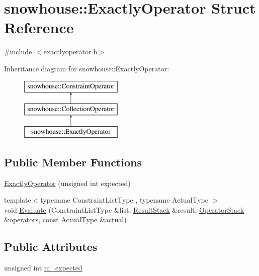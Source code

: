 \hypertarget{structsnowhouse_1_1ExactlyOperator}{}\section{snowhouse\+::Exactly\+Operator Struct Reference}
\label{structsnowhouse_1_1ExactlyOperator}


{\ttfamily \#include $<$exactlyoperator.\+h$>$}

Inheritance diagram for snowhouse\+::Exactly\+Operator\+:\begin{figure}[H]
\begin{center}
\leavevmode
\includegraphics[height=3.000000cm]{structsnowhouse_1_1ExactlyOperator}
\end{center}
\end{figure}
\subsection*{Public Member Functions}
\begin{DoxyCompactItemize}
\item 
\mbox{\hyperlink{structsnowhouse_1_1ExactlyOperator_ad41743f3689a619a955064697850750d}{Exactly\+Operator}} (unsigned int expected)
\item 
{\footnotesize template$<$typename Constraint\+List\+Type , typename Actual\+Type $>$ }\\void \mbox{\hyperlink{structsnowhouse_1_1ExactlyOperator_a7e801c5875cc639bb87b0cb579c698d1}{Evaluate}} (Constraint\+List\+Type \&list, \mbox{\hyperlink{namespacesnowhouse_a719169b1315a13161c15f25e600a8f51}{Result\+Stack}} \&result, \mbox{\hyperlink{namespacesnowhouse_adcb10e215e6a4bbcb35722a9c7270fc6}{Operator\+Stack}} \&operators, const Actual\+Type \&actual)
\end{DoxyCompactItemize}
\subsection*{Public Attributes}
\begin{DoxyCompactItemize}
\item 
unsigned int \mbox{\hyperlink{structsnowhouse_1_1ExactlyOperator_a0b37e44c30201b2c71b39f577340eb00}{m\+\_\+expected}}
\end{DoxyCompactItemize}

